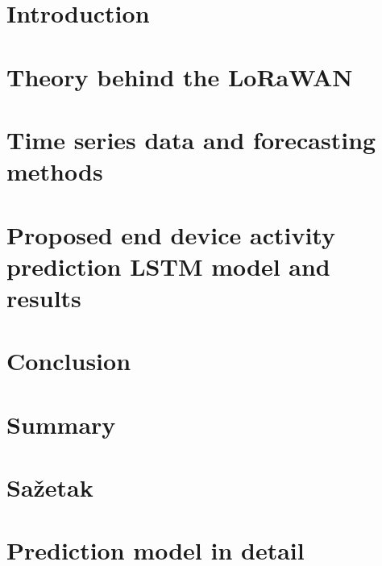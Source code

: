 \documentclass[12pt,twoside]{report}
\begin{document}

\tableofcontents


\chapter{Introduction}


\chapter{Theory behind the LoRaWAN}


\chapter{Time series data and forecasting methods}


\chapter{Proposed end device activity prediction LSTM model and results}


\chapter{Conclusion}


\printbibliography
{}


\listoffigures
{}

\chapter*{Summary}


\chapter*{Sažetak}


\appendix
\chapter{Prediction model in detail}

\end{document}

